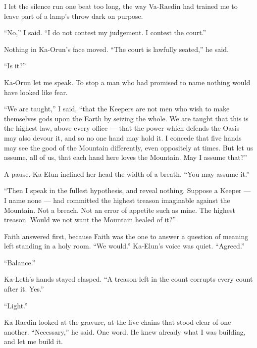 \ornament
 
I let the silence run one beat too long, the way Va-Raedin had trained me to leave part of a lamp's throw dark on purpose.\par
 
``No,'' I said. ``I do not contest my judgement. I contest the court.''\par
 
Nothing in Ka-Orun's face moved. ``The court is lawfully seated,'' he said.\par
 
``Is it?'' 
 
Ka-Orun let me speak. To stop a man who had promised to name nothing would have looked like fear.\par
 
``We are taught,'' I said, ``that the Keepers are not men who wish to make themselves gods upon the Earth by seizing the whole. We are taught that this is the highest law, above every office --- that the power which defends the Oasis may also devour it, and so no one hand may hold it. I concede that five hands may see the good of the Mountain differently, even oppositely at times. But let us assume, all of us, that each hand here loves the Mountain. May I assume that?''\par
 
A pause. Ka-Elun inclined her head the width of a breath. ``You may assume it.''\par
 
``Then I speak in the fullest hypothesis, and reveal nothing. Suppose a Keeper --- I name none --- had committed the highest treason imaginable against the Mountain. Not a breach. Not an error of appetite such as mine. The highest treason. Would we not want the Mountain healed of it?''\par
 
Faith answered first, because Faith was the one to answer a question of meaning left standing in a holy room. ``We would.'' Ka-Elun's voice was quiet. ``Agreed.''\par

``Balance.''\par

Ka-Leth's hands stayed clasped. ``A treason left in the count corrupts every count after it. Yes.''\par

``Light.''\par

Ka-Raedin looked at the gravure, at the five chains that stood clear of one another. ``Necessary,'' he said. One word. He knew already what I was building, and let me build it.\par

